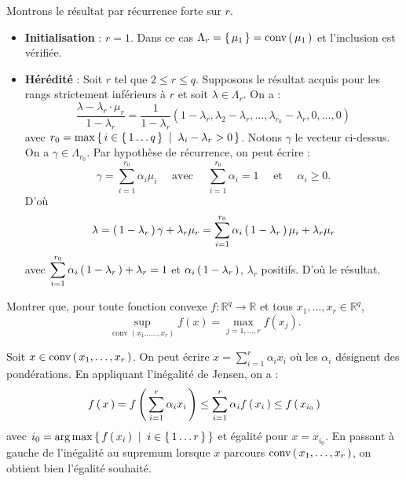 \begin{rep}

 Montrons le résultat par récurrence forte sur $r$.
 \begin{itemize}[font= \color{blue} \Large, label= $\bullet$]
  \item \textbf{Initialisation} : $r = 1$. Dans ce cas $\Lambda _ { r } =
         \left \{ \, \mu_1 \, \right \} = \operatorname{conv} \left( \, \mu_1 \, \right)$ et l'inclusion est vérifiée.
  \item \textbf{Hérédité} : Soit $r$ tel que $2 \leq r \leq q$. Supposons le résultat acquis pour les
        rangs strictement inférieurs à $r$ et soit $\lambda \in \Lambda _ { r }$. On a :
        $$\frac{\lambda - \lambda_r \cdot \mu_r}{1 - \lambda_r} = \frac{1}{1-\lambda_r}(1-\lambda_r, \lambda_2-\lambda_r, \ldots, \lambda_{r_0}-\lambda_{r}, 0, \ldots, 0)$$
        avec $\displaystyle r_0 = \max \left \{ \, i \in \left \{ \, 1 \ldots q \, \right \} \; \mid \; \lambda_i-\lambda_r>0 \, \right \}$. Notons $\gamma$ le vecteur ci-dessus. On a $\displaystyle \gamma \in \Lambda_{r_0}$. Par hypothèse de récurrence, on peut écrire :
        $$\gamma = \sum_{i=1}^{r_0} \alpha_i \mu_i \quad \text{ avec } \quad
         \sum_{i=1}^{r_0} \alpha_i=1 \quad \text{ et } \quad \alpha_i \geq 0.$$
        D'où
        $$
         \lambda = \left( \, 1-\lambda_r \, \right) \gamma + \lambda_r \mu_r
         = \sum_{i=1}^{r_0} \alpha_i \left( \, 1-\lambda_r \, \right) \mu_i + \lambda_r \mu_r
        $$
        avec $\displaystyle \sum_{i=1}^{r_0} \alpha_i \left( \, 1-\lambda_r \, \right) + \lambda_r=1$ et
        $\alpha_i \left( \, 1-\lambda_r \, \right)$, $\lambda_r$ positifs. D'où le résultat.
 \end{itemize}
\end{rep}

\begin{qst}
 Montrer que, pour toute fonction convexe $f : \mathbb { R } ^ { q } \rightarrow \mathbb { R }$
 et tous $x _ { 1 } , \dots , x _ { r } \in \mathbb { R } ^ { q }$,
 $$\sup _ { \operatorname { conv } \left( x _ { 1 } \ldots \ldots , x _ { r } \right) } f ( x ) = \max _ { j = 1 , \ldots , r } f \left( x _ { j } \right).$$
\end{qst}

\begin{rep}
 Soit $x \in \operatorname{conv} \left( \, x_1, \ldots, x_r \, \right)$. On peut écrire $x = \sum_{i=1}^{r}
  \alpha_i x_i$ où les $\alpha_i$ désignent des pondérations. En appliquant l'inégalité
 de Jensen, on a :
 $$f\left( \, x \, \right) = f\left( \, \sum_{i=1}^{r} \alpha_i x_i \, \right) \leq \sum_{i=1}^{r} \alpha_i f\left( \, x_i \, \right)
  \leq f\left( \, x_{i_0} \, \right)$$
 avec $\displaystyle i_0 = \operatorname*{arg\,max} \left \{ \, f\left( \, x_i \, \right) \; \mid \; i \in \left \{ \, 1 \ldots r \, \right \} \, \right \}$
 et égalité pour $x = x_{i_0}$. En passant à gauche de l'inégalité au supremum
  lorsque $x$ parcours $\operatorname{conv} \left( \, x_1, \ldots, x_r \, \right)$, on obtient bien l'égalité
  souhaité.
\end{rep}

